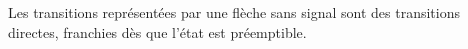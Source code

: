 Les transitions représentées par une flèche sans signal sont des transitions directes, franchies dès que l'état est préemptible.\p
   
   
\nocite{webpage_FiniteStateAutomata_}
%
%
\printbibliography


